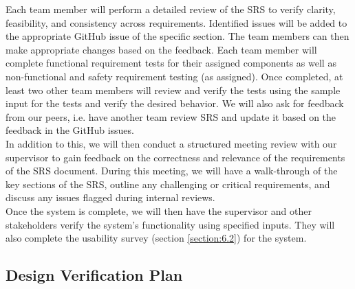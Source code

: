\documentclass[12pt, titlepage]{article}
\begin{document}
Each team member will perform a detailed review of the SRS to verify clarity, feasibility, and consistency across requirements. Identified issues will be added to the appropriate GitHub issue of the specific section. The team members can then make appropriate changes based on the feedback. Each team member will complete functional requirement tests for their assigned components as well as non-functional and safety requirement testing (as assigned). Once completed, at least two other team members will review and verify the tests using the sample input for the tests and verify the desired behavior. We will also ask for feedback from our peers, i.e. have another team review SRS and update it based on the feedback in the GitHub issues.\\ 
In addition to this, we will then conduct a structured meeting review with our supervisor to gain feedback on the correctness and relevance of the requirements of the SRS document. During this meeting, we will have a walk-through of the key sections of the SRS, outline any challenging or critical requirements, and discuss any issues flagged during internal reviews.\\
Once the system is complete, we will then have the supervisor and other stakeholders verify the system's functionality using specified inputs. They will also complete the usability survey (section \ref{section:6.2}) for the system.


\subsection{Design Verification Plan} \label{section:3.3}
\end{document}
